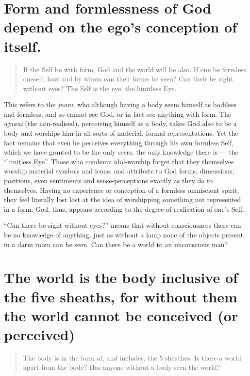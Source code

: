 \documentclass[12pt]{report}
\begin{document}
\section{ Form and formlessness of God depend on the ego's
  conception of itself.}

\begin{quote}
  If the Self be with form, God and the world will be also. If one be
  formless oneself, how and by whom can their forms be seen? Can their
  be sight without eyes? The Self is the eye, the limitless Eye.
\end{quote}


This refers to the \emph{jnani}, who although having a body seem
himself as bodiless and formless, and so cannot see God, or in fact
see anything with form. The \emph{ajnani} (the non-realised),
perceiving himself as a body, takes God also to be a body and worships
him in all sorts of material, formal representations. Yet the fact
remains that even he perceives everything through his own formless
Self, which we have granted to be the only seers, the only knowledge
there is --- the ``limitless Eye''. Those who condemn idol-worship
forget that they themselves worship material symbols and icons, and
attribute to God forms, dimensions, positions, even sentiments and
sense-perceptions exactly as they do to themselves. Having no
experience or conception of a formless omniscient spirit, they feel
literally lost lost at the idea of worshipping something not
represented in a form. God, thus, appears according to the degree of
realisation of one's Self.

``Can there be sight without eyes?'' means that without consciousness
there can be no knowledge of anything, just as without a lamp none of
the objects present in a darm room can be seen. Can there be a world
to an unconscious man?

\section{ The world is the body inclusive of the five sheaths, for
  without them the world cannot be conceived (or perceived)}

\begin{quote}
  The body is in the form of, and includes, the 5 sheathes. Is there a
  world apart from the body? Has anyone without a body seen the world?
\end{quote}

\end{document}

